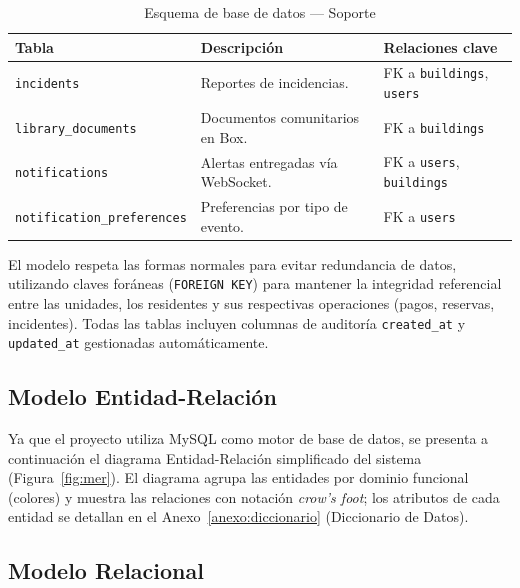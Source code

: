 \begin{table}[H]
\centering
\caption{Esquema de base de datos --- Soporte}\label{tab:esquema-soporte}
\begin{tabular}{|p{}|p{}|p{}|}
\hline
\textbf{Tabla} & \textbf{Descripción} & \textbf{Relaciones clave} \\
\hline
\texttt{incidents} & Reportes de incidencias. & FK a \texttt{buildings}, \texttt{users} \\
\hline
\texttt{library\_documents} & Documentos comunitarios en Box. & FK a \texttt{buildings} \\
\hline
\texttt{notifications} & Alertas entregadas vía WebSocket. & FK a \texttt{users}, \texttt{buildings} \\
\hline
\texttt{notification\_preferences} & Preferencias por tipo de evento. & FK a \texttt{users} \\
\hline
\end{tabular}
\end{table}

El modelo respeta las formas normales para evitar redundancia de datos, utilizando claves foráneas (\texttt{FOREIGN KEY}) para mantener la integridad referencial entre las unidades, los residentes y sus respectivas operaciones (pagos, reservas, incidentes). Todas las tablas incluyen columnas de auditoría \texttt{created\_at} y \texttt{updated\_at} gestionadas automáticamente.

\clearpage
\subsection{Modelo Entidad-Relación}
\label{subsec:mer}

Ya que el proyecto utiliza MySQL como motor de base de datos, se presenta a continuación el diagrama Entidad-Relación simplificado del sistema (Figura~\ref{fig:mer}). El diagrama agrupa las entidades por dominio funcional (colores) y muestra las relaciones con notación \textit{crow's foot}; los atributos de cada entidad se detallan en el Anexo~\ref{anexo:diccionario} (Diccionario de Datos).

\begin{landscape}

\end{landscape}

\clearpage

\subsection{Modelo Relacional}
\label{subsec:mr}

